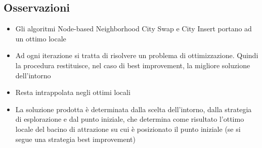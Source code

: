 \documentclass[9pt]{beamer}
\begin{document}
\subsection{Osservazioni}
\begin{frame}{\subsecname}

	\begin{itemize}
	
		\item
		Gli algoritmi Node-based Neighborhood City Swap e City Insert portano ad un ottimo locale

		\item
		Ad ogni iterazione si tratta di risolvere un problema di ottimizzazione. Quindi la procedura restituisce, nel caso di best improvement, la migliore soluzione dell’intorno

		\item
		Resta intrappolata negli ottimi locali

		\item
		La soluzione prodotta è determinata dalla scelta dell’intorno, dalla strategia di esplorazione e dal punto iniziale, che determina come risultato l’ottimo locale del bacino di attrazione su cui è posizionato il punto iniziale (se si segue una strategia best improvement)
		
	\end{itemize}

\end{frame}






\end{document}
